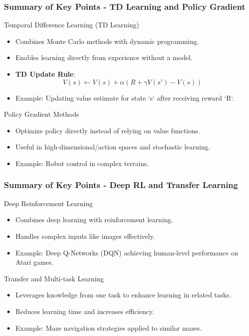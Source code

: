 \documentclass[aspectratio=169]{beamer}
\begin{document}
\begin{frame}[fragile]
    \frametitle{Summary of Key Points - TD Learning and Policy Gradient}
    \begin{block}{Temporal Difference Learning (TD Learning)}
        \begin{itemize}
            \item Combines Monte Carlo methods with dynamic programming.
            \item Enables learning directly from experience without a model.
            \item \textbf{TD Update Rule}:
            \begin{equation}
            V(s) \leftarrow V(s) + \alpha \left( R + \gamma V(s') - V(s) \right)
            \end{equation}
            \item Example: Updating value estimate for state `s` after receiving reward `R`.
        \end{itemize}
    \end{block}
    
    \begin{block}{Policy Gradient Methods}
        \begin{itemize}
            \item Optimize policy directly instead of relying on value functions.
            \item Useful in high-dimensional/action spaces and stochastic learning.
            \item Example: Robot control in complex terrains.
        \end{itemize}
    \end{block}
\end{frame}

\begin{frame}[fragile]
    \frametitle{Summary of Key Points - Deep RL and Transfer Learning}
    \begin{block}{Deep Reinforcement Learning}
        \begin{itemize}
            \item Combines deep learning with reinforcement learning.
            \item Handles complex inputs like images effectively.
            \item Example: Deep Q-Networks (DQN) achieving human-level performance on Atari games.
        \end{itemize}
    \end{block}

    \begin{block}{Transfer and Multi-task Learning}
        \begin{itemize}
            \item Leverages knowledge from one task to enhance learning in related tasks.
            \item Reduces learning time and increases efficiency.
            \item Example: Maze navigation strategies applied to similar mazes.
        \end{itemize}
    \end{block}
\end{frame}
\end{document}
